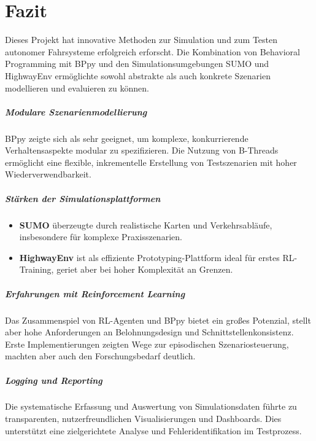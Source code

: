 \chapter{Fazit}

Dieses Projekt hat innovative Methoden zur Simulation und zum Testen autonomer Fahrsysteme erfolgreich erforscht. Die Kombination von Behavioral Programming mit BPpy und den Simulationsumgebungen SUMO und HighwayEnv ermöglichte sowohl abstrakte als auch konkrete Szenarien modellieren und evaluieren zu können\cite{EinfuehrungIntegrationsprojekt}.

\paragraph{Modulare Szenarienmodellierung}
BPpy zeigte sich als sehr geeignet, um komplexe, konkurrierende Verhaltensaspekte modular zu spezifizieren\cite{EinfuehrungIntegrationsprojekt}. Die Nutzung von B-Threads ermöglicht eine flexible, inkrementelle Erstellung von Testszenarien mit hoher Wiederverwendbarkeit.

\paragraph{Stärken der Simulationsplattformen}
\begin{itemize}
    \item \textbf{SUMO} überzeugte durch realistische Karten und Verkehrsabläufe, insbesondere für komplexe Praxisszenarien\cite{EinfuehrungIntegrationsprojekt}.
    \item \textbf{HighwayEnv} ist als effiziente Prototyping-Plattform ideal für erstes RL-Training, geriet aber bei hoher Komplexität an Grenzen\cite{EinfuehrungIntegrationsprojekt}.
\end{itemize}

\paragraph{Erfahrungen mit Reinforcement Learning}
Das Zusammenspiel von RL-Agenten und BPpy bietet ein großes Potenzial, stellt aber hohe Anforderungen an Belohnungsdesign und Schnittstellenkonsistenz. Erste Implementierungen zeigten Wege zur episodischen Szenariosteuerung, machten aber auch den Forschungsbedarf deutlich\cite{EinfuehrungIntegrationsprojekt}.

\paragraph{Logging und Reporting}
Die systematische Erfassung und Auswertung von Simulationsdaten führte zu transparenten, nutzerfreundlichen Visualisierungen und Dashboards\cite{EinfuehrungIntegrationsprojekt}. Dies unterstützt eine zielgerichtete Analyse und Fehleridentifikation im Testprozess.

